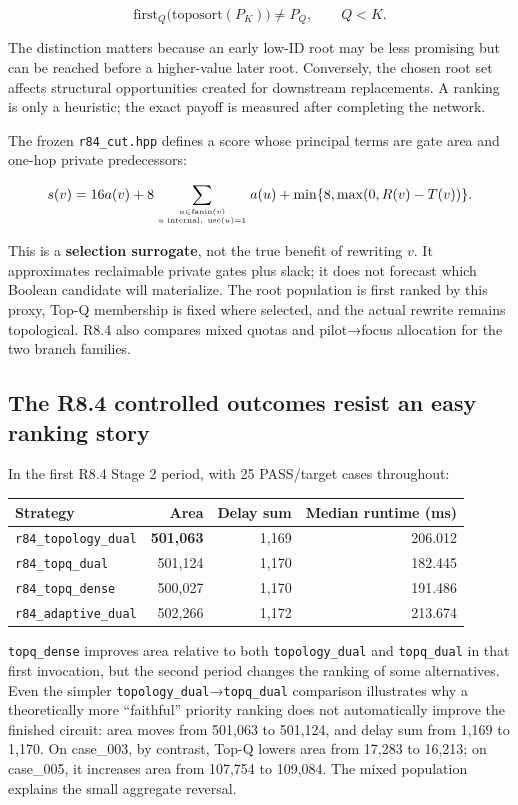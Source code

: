 \[
\mathrm{first}_{Q}\bigl(\mathrm{toposort}(P_K)\bigr)
\ne P_Q,\qquad Q<K.
\]

The distinction matters because an early low-ID root may be less promising but can be reached before a higher-value later root. Conversely, the chosen root set affects structural opportunities created for downstream replacements. A ranking is only a heuristic; the exact payoff is measured after completing the network.

The frozen \texttt{r84\_cut.hpp} defines a score whose principal terms are gate area and one-hop private predecessors:

\[
s(v)=16a(v)+8\sum_{u\in\mathrm{fanin}(v)\atop u\text{ internal},\ \mathrm{use}(u)=1}a(u)
+\min\{8,\max(0,R(v)-T(v))\}.
\]

This is a \textbf{selection surrogate}, not the true benefit of rewriting \(v\). It approximates reclaimable private gates plus slack; it does not forecast which Boolean candidate will materialize. The root population is first ranked by this proxy, Top-Q membership is fixed where selected, and the actual rewrite remains topological. R8.4 also compares mixed quotas and pilot→focus allocation for the two branch families.

\subsection{The R8.4 controlled outcomes resist an easy ranking story}\label{the-r8.4-controlled-outcomes-resist-an-easy-ranking-story}

In the first R8.4 Stage 2 period, with 25 PASS/target cases throughout:

\begin{longtable}[]{@{}lrrr@{}}
\toprule\noalign{}
Strategy & Area & Delay sum & Median runtime (ms) \\
\midrule\noalign{}
\endhead
\bottomrule\noalign{}
\endlastfoot
\texttt{r84\_topology\_dual} & \textbf{501,063} & 1,169 & 206.012 \\
\texttt{r84\_topq\_dual} & 501,124 & 1,170 & 182.445 \\
\texttt{r84\_topq\_dense} & 500,027 & 1,170 & 191.486 \\
\texttt{r84\_adaptive\_dual} & 502,266 & 1,172 & 213.674 \\
\end{longtable}

\texttt{topq\_dense} improves area relative to both \texttt{topology\_dual} and \texttt{topq\_dual} in that first invocation, but the second period changes the ranking of some alternatives. Even the simpler \texttt{topology\_dual}→\texttt{topq\_dual} comparison illustrates why a theoretically more ``faithful'' priority ranking does not automatically improve the finished circuit: area moves from 501,063 to 501,124, and delay sum from 1,169 to 1,170. On case\_003, by contrast, Top-Q lowers area from 17,283 to 16,213; on case\_005, it increases area from 107,754 to 109,084. The mixed population explains the small aggregate reversal.

